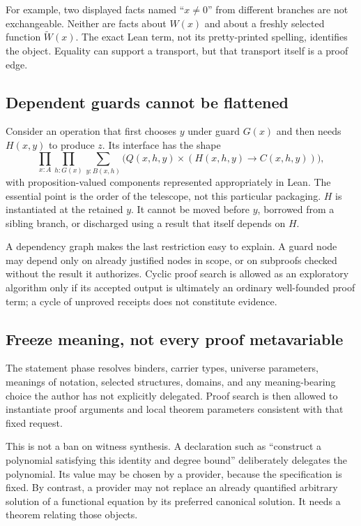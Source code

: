 \documentclass[11pt,a4paper]{article}
\theoremstyle{plain}
\theoremstyle{definition}
\begin{document}
For example, two displayed facts named ``$x\ne0$'' from different branches are not exchangeable. Neither are facts about $W(x)$ and about a freshly selected function $\widetilde W(x)$. The exact Lean term, not its pretty-printed spelling, identifies the object. Equality can support a transport, but that transport itself is a proof edge.

\subsection{Dependent guards cannot be flattened}
Consider an operation that first chooses $y$ under guard $G(x)$ and then needs $H(x,y)$ to produce $z$. Its interface has the shape
\[
 \prod_{x:A}\prod_{h:G(x)}
 \sum_{y:B(x,h)}\bigl(Q(x,h,y)\times
       (H(x,h,y)\to C(x,h,y))\bigr),
\]
with proposition-valued components represented appropriately in Lean. The essential point is the order of the telescope, not this particular packaging. $H$ is instantiated at the retained $y$. It cannot be moved before $y$, borrowed from a sibling branch, or discharged using a result that itself depends on $H$.

A dependency graph makes the last restriction easy to explain. A guard node may depend only on already justified nodes in scope, or on subproofs checked without the result it authorizes. Cyclic proof search is allowed as an exploratory algorithm only if its accepted output is ultimately an ordinary well-founded proof term; a cycle of unproved receipts does not constitute evidence.

\subsection{Freeze meaning, not every proof metavariable}
The statement phase resolves binders, carrier types, universe parameters, meanings of notation, selected structures, domains, and any meaning-bearing choice the author has not explicitly delegated. Proof search is then allowed to instantiate proof arguments and local theorem parameters consistent with that fixed request.

This is not a ban on witness synthesis. A declaration such as ``construct a polynomial satisfying this identity and degree bound'' deliberately delegates the polynomial. Its value may be chosen by a provider, because the specification is fixed. By contrast, a provider may not replace an already quantified arbitrary solution of a functional equation by its preferred canonical solution. It needs a theorem relating those objects.
\end{document}

